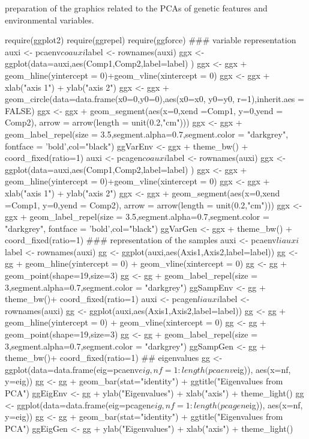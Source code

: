 \documentclass[a4paper,10pt]{article}
\begin{document}
preparation of the graphics related to the PCAs of genetic features and environmental variables.
\begin{Schunk}
\begin{Sinput}
  require(ggplot2)
  require(ggrepel)
  require(ggforce)
  ### variable representation
  auxi <- pcaenv$co
  auxi$label <- rownames(auxi)
  ggx <- ggplot(data=auxi,aes(Comp1,Comp2,label=label) )
  ggx <- ggx + geom_hline(yintercept = 0)+geom_vline(xintercept = 0)
  ggx <- ggx + xlab("axis 1") + ylab("axis 2")
  ggx <- ggx + geom_circle(data=data.frame(x0=0,y0=0),aes(x0=x0, y0=y0, r=1),inherit.aes = FALSE)
  ggx <- ggx + geom_segment(aes(x=0,xend =Comp1, y=0,yend = Comp2),
                           arrow = arrow(length = unit(0.2,"cm")))
  ggx <- ggx + geom_label_repel(size = 3.5,segment.alpha=0.7,segment.color = "darkgrey",
                               fontface = 'bold',col="black")
  ggVarEnv <- ggx + theme_bw() + coord_fixed(ratio=1)
  auxi <- pcagen$co
  auxi$label <- rownames(auxi)
  ggx <- ggplot(data=auxi,aes(Comp1,Comp2,label=label) )
  ggx <- ggx + geom_hline(yintercept = 0)+geom_vline(xintercept = 0)
  ggx <- ggx + xlab("axis 1") + ylab("axis 2")
  ggx <- ggx + geom_segment(aes(x=0,xend =Comp1, y=0,yend = Comp2),
                           arrow = arrow(length = unit(0.2,"cm")))
  ggx <- ggx + geom_label_repel(size = 3.5,segment.alpha=0.7,segment.color = "darkgrey",
                               fontface = 'bold',col="black")
  ggVarGen <- ggx + theme_bw() + coord_fixed(ratio=1)
  ### representation of the samples
  auxi <- pcaenv$li
  auxi$label <- rownames(auxi)
  gg <- ggplot(auxi,aes(Axis1,Axis2,label=label))
  gg <- gg + geom_hline(yintercept = 0) + geom_vline(xintercept = 0)
  gg <- gg + geom_point(shape=19,size=3)
  gg <- gg + geom_label_repel(size = 3,segment.alpha=0.7,segment.color = "darkgrey")
  ggSampEnv <-  gg + theme_bw()+ coord_fixed(ratio=1)
  auxi <- pcagen$li
  auxi$label <- rownames(auxi)
  gg <- ggplot(auxi,aes(Axis1,Axis2,label=label))
  gg <- gg + geom_hline(yintercept = 0) + geom_vline(xintercept = 0)
  gg <- gg + geom_point(shape=19,size=3)
  gg <- gg + geom_label_repel(size = 3,segment.alpha=0.7,segment.color = "darkgrey")
  ggSampGen <-  gg + theme_bw()+ coord_fixed(ratio=1)
  ## eigenvalues
  gg <- ggplot(data=data.frame(eig=pcaenv$eig,nf=1:length(pcaenv$eig)), aes(x=nf, y=eig)) 
  gg <- gg + geom_bar(stat="identity") + ggtitle("Eigenvalues from PCA") 
  ggEigEnv <- gg + ylab("Eigenvalues") + xlab("axis") + theme_light() 
  gg <- ggplot(data=data.frame(eig=pcagen$eig,nf=1:length(pcagen$eig)), aes(x=nf, y=eig)) 
  gg <- gg + geom_bar(stat="identity") + ggtitle("Eigenvalues from PCA") 
  ggEigGen <- gg + ylab("Eigenvalues") + xlab("axis") + theme_light() 
\end{Sinput}
\end{Schunk}
\end{document}
